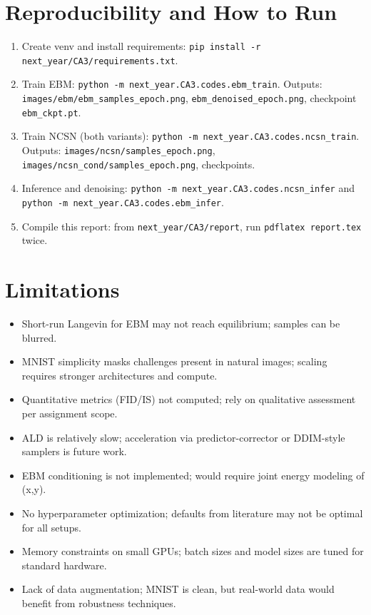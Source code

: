 \documentclass[a4paper,12pt]{article}
\begin{document}
\section{Reproducibility and How to Run}
\label{sec:repro}
\begin{enumerate}[leftmargin=*]
    \item Create venv and install requirements: \texttt{pip install -r next\_year/CA3/requirements.txt}.
    \item Train EBM: \texttt{python -m next\_year.CA3.codes.ebm\_train}. Outputs: \texttt{images/ebm/ebm\_samples\_epoch\*.png}, \texttt{ebm\_denoised\_epoch\*.png}, checkpoint \texttt{ebm\_ckpt.pt}.
    \item Train NCSN (both variants): \texttt{python -m next\_year.CA3.codes.ncsn\_train}. Outputs: \texttt{images/ncsn/samples\_epoch\*.png}, \texttt{images/ncsn\_cond/samples\_epoch\*.png}, checkpoints.
    \item Inference and denoising: \texttt{python -m next\_year.CA3.codes.ncsn\_infer} and \texttt{python -m next\_year.CA3.codes.ebm\_infer}.
    \item Compile this report: from \texttt{next\_year/CA3/report}, run \texttt{pdflatex report.tex} twice.
\end{enumerate}

\section{Limitations}
\begin{itemize}[leftmargin=*]
    \item Short-run Langevin for EBM may not reach equilibrium; samples can be blurred.
    \item MNIST simplicity masks challenges present in natural images; scaling requires stronger architectures and compute.
    \item Quantitative metrics (FID/IS) not computed; rely on qualitative assessment per assignment scope.
    \item ALD is relatively slow; acceleration via predictor-corrector or DDIM-style samplers is future work.
    \item EBM conditioning is not implemented; would require joint energy modeling of (x,y).
    \item No hyperparameter optimization; defaults from literature may not be optimal for all setups.
    \item Memory constraints on small GPUs; batch sizes and model sizes are tuned for standard hardware.
    \item Lack of data augmentation; MNIST is clean, but real-world data would benefit from robustness techniques.
\end{itemize}
\end{document}
